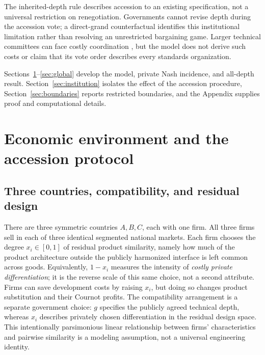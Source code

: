 \documentclass[11pt,a4paper]{article}
\theoremstyle{remark}\newtheorem{remark}[theorem]{Remark}
\begin{document}
The inherited-depth rule describes accession to an existing specification, not a universal restriction on renegotiation. Governments cannot revise depth during the accession vote; a direct-grand counterfactual identifies this institutional limitation rather than resolving an unrestricted bargaining game. Larger technical committees can face costly coordination \citep{Simcoe2012}, but the model does not derive such costs or claim that its vote order describes every standards organization.

Sections~\ref{sec:model}--\ref{sec:global} develop the model, private Nash incidence, and all-depth result. Section~\ref{sec:institution} isolates the effect of the accession procedure, Section~\ref{sec:boundaries} reports restricted boundaries, and the Appendix supplies proof and computational details.

\section{Economic environment and the accession protocol}\label{sec:model}
\subsection{Three countries, compatibility, and residual design}
There are three symmetric countries $A,B,C$, each with one firm. All three firms sell in each of three identical segmented national markets. Each firm chooses the degree $x_i\in[0,1]$ of residual product similarity, namely how much of the product architecture outside the publicly harmonized interface is left common across goods. Equivalently, $1-x_i$ measures the intensity of \emph{costly private differentiation}; it is the reverse scale of this same choice, not a second attribute. Firms can save development costs by raising $x_i$, but doing so changes product substitution and their Cournot profits. The compatibility arrangement is a separate government choice: $g$ specifies the publicly agreed technical depth, whereas $x_i$ describes privately chosen differentiation in the residual design space. This intentionally parsimonious linear relationship between firms' characteristics and pairwise similarity is a modeling assumption, not a universal engineering identity.
\end{document}
